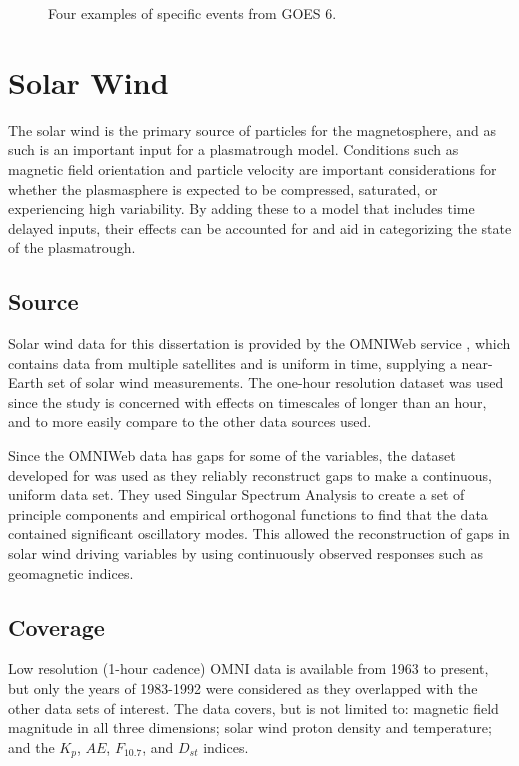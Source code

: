 \begin{figure}[htp!]
	\caption{Four examples of specific events from GOES 6.}
	\label{fig:alldata-examples}
\end{figure}





\section{Solar Wind}
The solar wind is the primary source of particles for the magnetosphere, and as such is an important input for a plasmatrough model. Conditions such as magnetic field orientation and particle velocity are important considerations for whether the plasmasphere is expected to be compressed, saturated, or experiencing high variability. By adding these to a model that includes time delayed inputs, their effects can be accounted for and aid in categorizing the state of the plasmatrough.

\subsection{Source}
Solar wind data for this dissertation is provided by the OMNIWeb service \citep{OMNIWebKing2005}, which contains data from multiple satellites and is uniform in time, supplying a near-Earth set of solar wind measurements. The one-hour resolution dataset was used since the study is concerned with effects on timescales of longer than an hour, and to more easily compare to the other data sources used. 

Since the OMNIWeb data has gaps for some of the variables, the dataset developed for \cite{Kondrashov2014ReconstructionOfGaps} was used as they reliably reconstruct gaps to make a continuous, uniform data set. They used Singular Spectrum Analysis to create a set of principle components and empirical orthogonal functions to find that the data contained significant oscillatory modes. This allowed the reconstruction of gaps in solar wind driving variables by using continuously observed responses such as geomagnetic indices.

\subsection{Coverage}
Low resolution (1-hour cadence) OMNI data is available from 1963 to present, but only the years of 1983-1992 were considered as they overlapped with the other data sets of interest. The data covers, but is not limited to: magnetic field magnitude in all three dimensions; solar wind proton density and temperature; and the $K_p$, $AE$, $F_{10.7}$, and $D_{st}$ indices.

